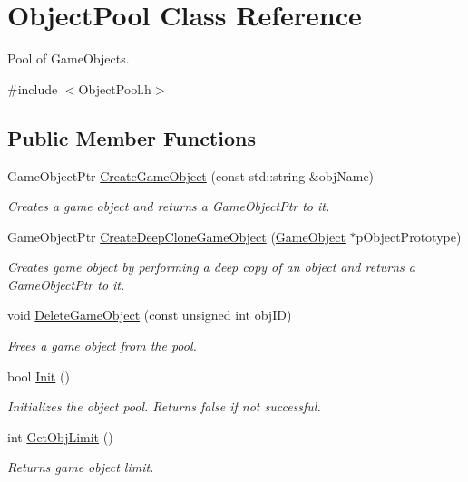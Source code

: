 \hypertarget{class_object_pool}{}\section{Object\+Pool Class Reference}
\label{class_object_pool}


Pool of Game\+Objects.  




{\ttfamily \#include $<$Object\+Pool.\+h$>$}

\subsection*{Public Member Functions}
\begin{DoxyCompactItemize}
\item 
Game\+Object\+Ptr \mbox{\hyperlink{class_object_pool_acbae5f0774df14a2ddccc0786c3863c3}{Create\+Game\+Object}} (const std\+::string \&obj\+Name)
\begin{DoxyCompactList}\small\item\em Creates a game object and returns a Game\+Object\+Ptr to it. \end{DoxyCompactList}\item 
Game\+Object\+Ptr \mbox{\hyperlink{class_object_pool_a49990f34429a9468b2b2344765ac75dd}{Create\+Deep\+Clone\+Game\+Object}} (\mbox{\hyperlink{class_game_object}{Game\+Object}} $\ast$p\+Object\+Prototype)
\begin{DoxyCompactList}\small\item\em Creates game object by performing a deep copy of an object and returns a Game\+Object\+Ptr to it. \end{DoxyCompactList}\item 
void \mbox{\hyperlink{class_object_pool_a074b2f5730a286179cf5e0f5bd9374ce}{Delete\+Game\+Object}} (const unsigned int obj\+ID)
\begin{DoxyCompactList}\small\item\em Frees a game object from the pool. \end{DoxyCompactList}\item 
\mbox{\label{class_object_pool_aa8764710e7d98d249aac86b69b0f1263}} 
bool \mbox{\hyperlink{class_object_pool_aa8764710e7d98d249aac86b69b0f1263}{Init}} ()
\begin{DoxyCompactList}\small\item\em Initializes the object pool. Returns false if not successful. \end{DoxyCompactList}\item 
\mbox{\label{class_object_pool_a1469f91b4960d14f34ab411509ce15cc}} 
int \mbox{\hyperlink{class_object_pool_a1469f91b4960d14f34ab411509ce15cc}{Get\+Obj\+Limit}} ()
\begin{DoxyCompactList}\small\item\em Returns game object limit. \end{DoxyCompactList}\end{DoxyCompactItemize}


